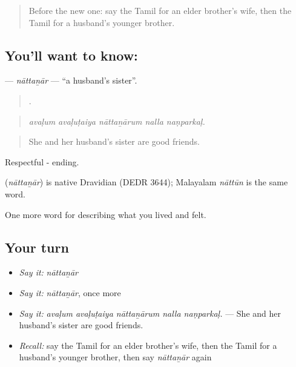 \label{lesson:TA-C493-nattanar}



\begin{quote}
Before the new one: say the Tamil for an elder brother’s wife, then the Tamil for a husband’s younger brother.
\end{quote}

\subsection*{You'll want to know: }
\textbf{} — \emph{nāttaṉār} — \textquotedblleft{}a husband’s sister\textquotedblright{}.

\begin{quote}
    .
\end{quote}

\begin{quote}
\emph{avaḷum avaḷuṭaiya nāttaṉārum nalla naṇparkaḷ.}
\end{quote}

\begin{quote}
She and her husband’s sister are good friends.
\end{quote}

Respectful - ending.

\begin{cousinweb}
\textbf{} (\emph{nāttaṉār}) is native Dravidian (DEDR 3644); Malayalam \emph{nāttūn} is the same word.
\end{cousinweb}

\begin{grammarlens}[title={What you've built}]
One more word for describing what you lived and felt.
\end{grammarlens}

\subsection*{Your turn}
\begin{itemize}
\raggedright
  \item \emph{Say it:} \emph{nāttaṉār}
  \item \emph{Say it:} \emph{nāttaṉār}, once more
  \item \emph{Say it:} \emph{avaḷum avaḷuṭaiya nāttaṉārum nalla naṇparkaḷ.} — She and her husband’s sister are good friends.
  \item \emph{Recall:} say the Tamil for an elder brother’s wife, then the Tamil for a husband’s younger brother, then say \emph{nāttaṉār} again
\end{itemize}


